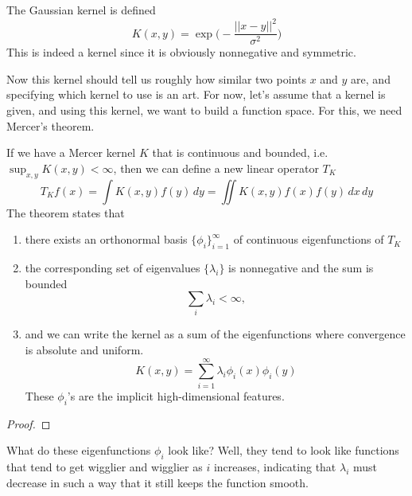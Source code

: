   \begin{example}
    The Gaussian kernel is defined 
    \begin{equation}
      K(x, y) = \exp \bigg( - \frac{||x - y||^2}{\sigma^2} \bigg)
    \end{equation}
    This is indeed a kernel since it is obviously nonnegative and symmetric. 
  \end{example} 

  Now this kernel should tell us roughly how similar two points $x$ and $y$ are, and specifying which kernel to use is an art. For now, let's assume that a kernel is given, and using this kernel, we want to build a function space. For this, we need Mercer's theorem. 

  \begin{theorem}
    If we have a Mercer kernel $K$ that is continuous and bounded, i.e. $\sup_{x, y} K(x, y) < \infty$, then we can define a new linear operator $T_K$ 
    \begin{equation}
      T_K f(x) =  \int K(x, y) f(y) \,dy = \iint K(x, y) f(x) f(y) \,dx\,dy
    \end{equation}
    The theorem states that 
    \begin{enumerate}
      \item there exists an orthonormal basis $\{\phi_i\}_{i=1}^\infty$ of continuous eigenfunctions of $T_K$ 
      \item the corresponding set of eigenvalues $\{\lambda_i\}$ is nonnegative and the sum is bounded 
      \begin{equation}
        \sum_i \lambda_i < \infty, 
      \end{equation}
      \item and we can write the kernel as a sum of the eigenfunctions where convergence is absolute and uniform. 
      \begin{equation}
        K(x, y) = \sum_{i=1}^\infty \lambda_i \phi_i(x) \phi_i(y)
      \end{equation}
      These $\phi_i$'s are the implicit high-dimensional features. 
    \end{enumerate}
  \end{theorem}
  \begin{proof}
    
  \end{proof}

  What do these eigenfunctions $\phi_i$ look like? Well, they tend to look like functions that tend to get wigglier and wigglier as $i$ increases, indicating that $\lambda_i$ must decrease in such a way that it still keeps the function smooth. 

